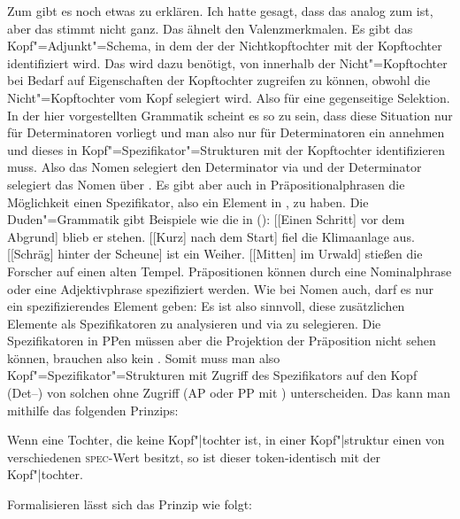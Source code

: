 \noindent
Zum \specw gibt es noch etwas zu erklären. Ich hatte gesagt, dass das \specm analog zum \modm ist,
aber das stimmt nicht ganz. Das \modm ähnelt den Valenzmerkmalen. Es gibt das Kopf"=Adjunkt"=Schema,
in dem der \modw der Nichtkopftochter mit der Kopftochter identifiziert wird. Das \specm wird dazu
benötigt, von innerhalb der Nicht"=Kopftochter bei Bedarf auf Eigenschaften der Kopftochter
zugreifen zu können, obwohl die Nicht"=Kopftochter vom Kopf selegiert wird. Also für eine
gegenseitige Selektion. In der hier vorgestellten Grammatik scheint es so zu sein, dass diese Situation nur
für Determinatoren vorliegt und man also nur für Determinatoren ein \specm annehmen und dieses in
Kopf"=Spezifikator"=Strukturen mit der Kopftochter identifizieren muss. Also das Nomen selegiert den
Determinator via \spr und der Determinator selegiert das Nomen über \spec. Es gibt aber auch in
Präpositionalphrasen die Möglichkeit einen Spezifikator, also ein Element in \spr, zu haben. Die Duden"=Grammatik \citeyearpar[\S 1300]{Duden2005} gibt Beispiele wie die in ():
\eal
\ex {}[[Einen Schritt] vor dem Abgrund] blieb er stehen.\label{Beispiel-Schritt-vor-dem-Abgrund}
\ex {}[[Kurz] nach dem Start] fiel die Klimaanlage aus.
\ex {}[[Schräg] hinter der Scheune] ist ein Weiher.
\ex {}[[Mitten] im Urwald] stießen die Forscher auf einen alten Tempel.
\zl
Präpositionen können durch eine Nominalphrase oder eine Adjektivphrase spezifiziert werden. Wie bei
Nomen auch, darf es nur ein spezifizierendes Element geben:
\eal
{}
\zl
Es ist also sinnvoll, diese zusätzlichen Elemente als Spezifikatoren zu analysieren und via \spr zu
selegieren. Die Spezifikatoren in PPen müssen aber die Projektion der Präposition nicht sehen
können, brauchen also kein \specm. Somit muss man also Kopf"=Spezifikator"=Strukturen mit Zugriff
des Spezifikators auf den Kopf (Det–\nbar) von solchen ohne Zugriff (AP oder PP mit \pbar)
unterscheiden. Das kann man mithilfe das folgenden Prinzips: 

\begin{prinzip-break} 
\label{prinzip-spec}
Wenn eine Tochter, die keine Kopf"|tochter ist, in einer Kopf"|struktur
einen von  verschiedenen \textsc{spec}-Wert besitzt, so ist dieser token-identisch mit
der Kopf"|tochter.
\end{prinzip-break}
Formalisieren lässt sich das Prinzip wie folgt:
\ea
{} \impl\\
\hfill{}
\z



